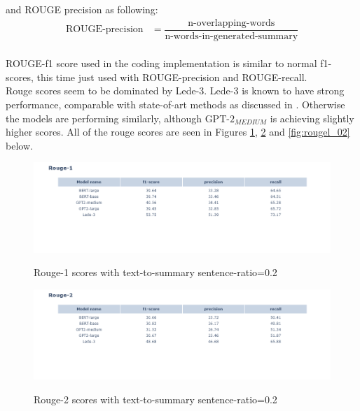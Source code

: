 \documentclass{article}
\newcommand{\gptmedium}{$\text{GPT-2}_{MEDIUM}$ }
\begin{document}
\noindent
and ROUGE precision as following:\\

\begin{align*}
	\text{ROUGE-precision} &= \dfrac{\text{n-overlapping-words}}{\text{n-words-in-generated-summary}}
\end{align*}\\

\noindent
ROUGE-f1 score used in the coding implementation is similar to normal f1-scores, this time just used with ROUGE-precision and ROUGE-recall. \cite{rouge}\\

\noindent
Rouge scores seem to be dominated by Lede-3. Lede-3 is known to have strong performance, comparable with state-of-art methods as discussed in \cite{dataset}. Otherwise the models are performing similarly, although \gptmedium is achieving slightly higher scores. All of the rouge scores are seen in Figures \ref{fig:rouge1_02}, \ref{fig:rouge2_02} and \ref{fig:rougel_02} below. 

\begin{figure}[H]
	\centering
	\hspace*{-3cm}
	\includegraphics[scale=0.55]{rouge1.png}\\
	\caption{Rouge-1 scores with text-to-summary sentence-ratio=0.2}
	\label{fig:rouge1_02}
\end{figure}

\begin{figure}[H]
	\centering
	\hspace*{-3cm}
	\includegraphics[scale=0.55]{rouge2.png}\\
	\caption{Rouge-2 scores with text-to-summary sentence-ratio=0.2}
	\label{fig:rouge2_02}
\end{figure}
\end{document}
